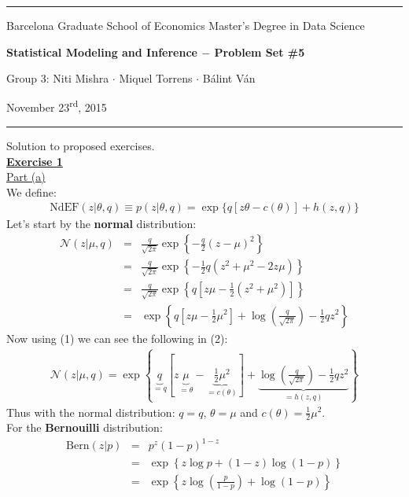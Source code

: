 \documentclass[a4paper, 11pt]{article}
\newcommand{\header}[4]{
	\begin{center}
		\rule{\linewidth}{0.5pt}
		
		{\small{#1}}
      
        \vspace{0.2in}
        
		{\large{#2}}
		
        \vspace{0.2in}
        
		{\small{#3}}
		
		\vspace{0.15in}
		
		{#4}
		
		\vspace{-0.1in}
		\rule{\linewidth}{0.6pt}
	\end{center}
}
\begin{document}
 
\header{\sc Barcelona Graduate School of Economics \hfill Master's Degree in Data Science}{\bf Statistical Modeling and Inference $-$ Problem Set \#5}{\sc Group 3: Niti Mishra $\cdot$ Miquel Torrens $\cdot$ B\'alint V\'an}{November 23\textsuperscript{rd}, 2015}
Solution to proposed exercises.\\
\newline \textbf{\underline{Exercise 1}}\\
\newline \underline{Part (a)}\\
\newline We define:
\begin{eqnarray}
\text{NdEF}(z | \theta, q) \equiv p(z | \theta, q) = \exp \lbrace q [z \theta - c(\theta)] + h(z,q) \rbrace
\end{eqnarray}
Let's start by the \textbf{normal} distribution:
\begin{eqnarray}
\mathcal{N}(z | \mu, q) &=& \frac{q}{\sqrt{2 \pi}} \exp \left\{ -\frac{q}{2} (z - \mu)^2 \right\}  \nonumber \\
&=& \frac{q}{\sqrt{2 \pi}} \exp \left\{ -\frac{1}{2} q (z^2 + \mu^2 - 2z\mu) \right\}  \nonumber \\
&=& \frac{q}{\sqrt{2 \pi}} \exp \left\{ q \left[z \mu -\frac{1}{2} \left( z^2 + \mu^2 \right) \right] \right\}  \nonumber \\
&=& \exp \left\{ q \left[ z \mu - \frac{1}{2} \mu^2 \right] + \log \left(  \frac{q}{\sqrt{2 \pi}} \right) - \frac{1}{2} q z^2  \right\}
\end{eqnarray}
Now using (1) we can see the following in (2):
\begin{eqnarray}
\mathcal{N}(z | \mu, q) = \exp \left\{ \underbrace{q}_{= q} \left[ z \underbrace{\mu}_{=\theta} - \underbrace{\frac{1}{2} \mu^2}_{=c(\theta)} \right]   + \underbrace{\log \left( \frac{q}{\sqrt{2 \pi}} \right) - \frac{1}{2} q z^2}_{=h(z,q)}  \right\}
\end{eqnarray}
Thus with the normal distribution: $q = q$, $\theta = \mu$ and $c(\theta) = \frac{1}{2} \mu^2$.\\
\newline For the \textbf{Bernouilli} distribution:
\begin{eqnarray}
\text{Bern}(z | p) &=& p^z (1-p)^{1-z}  \nonumber \\
&=& \exp \left\{ z \log{p} + (1-z) \log{(1-p)} \right\} \nonumber \\
&=& \exp \left\{ z \log \left( \frac{p}{1-p} \right) + \log{(1-p)} \right\} \nonumber
\end{eqnarray}
\end{document}
